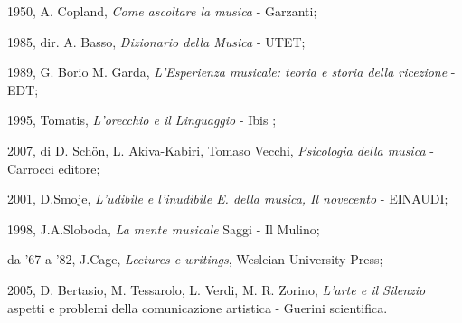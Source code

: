 \documentclass[a4paper,12pt]{article}
\begin{document}
\begin{thebibliography}{}

 	1950, A. Copland, \emph{Come ascoltare la musica} - Garzanti;

 1985, dir. A. Basso, \emph{Dizionario della Musica} - UTET;

 1989, G. Borio M. Garda, \emph{L'Esperienza musicale: teoria e storia della ricezione} - EDT;

 1995, Tomatis, \emph{L'orecchio e il Linguaggio} - Ibis ;

 2007, di D. Schön, L. Akiva-Kabiri, Tomaso Vecchi, \emph{Psicologia della musica} - Carrocci editore;

 2001, D.Smoje,  \emph{L'udibile e l'inudibile \small{E. della musica}, Il novecento} - EINAUDI;

 1998, J.A.Sloboda, \emph{La mente musicale} \small{Saggi} - Il Mulino;

 da '67 a '82, J.Cage, \emph{Lectures e writings}, Wesleian University Press;

 2005, D. Bertasio, M. Tessarolo, L. Verdi, M. R. Zorino, \emph{L'arte e il Silenzio}  \small{aspetti e problemi della comunicazione artistica - Guerini scientifica}.

\end{thebibliography}
\end{document}
